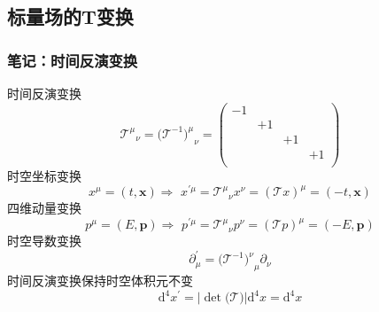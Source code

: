\subsection{标量场的T变换}

\subsubsection{笔记：时间反演变换}
时间反演变换
\begin{equation}
    {\mathcal{T} ^{\mu}}_{\nu}=(\mathcal{T} ^{-1}{)^{\mu}}_{\nu}=\left( \begin{matrix}
	-1&		&		&		\\
	&		+1&		&		\\
	&		&		+1&		\\
	&		&		&		+1\\
\end{matrix} \right) 
\end{equation}
时空坐标变换
\begin{equation}
    x^{\mu}=\left( t,\mathbf{x} \right) \Rightarrow \,\,x^{\prime \mu}={\mathcal{T} ^{\mu}}_{\nu}x^{\nu}=(\mathcal{T} x)^{\mu}=\left( -t,\mathbf{x} \right) 
\end{equation}
四维动量变换
\begin{equation}
    p^{\mu}=\left( E,\mathbf{p} \right) \Rightarrow \,\,p^{\prime \mu}={\mathcal{T} ^{\mu}}_{\nu}p^{\nu}=(\mathcal{T} p)^{\mu}=\left( -E,\mathbf{p} \right) 
\end{equation}
时空导数变换
\begin{equation}
    \partial _{\mu}^{\prime}=(\mathcal{T} ^{-1}{)^{\nu}}_{\mu}\partial _{\nu}
\end{equation}
时间反演变换保持时空体积元不变
\begin{equation}
    \mathrm{d}^4x^{\prime}=\left| \det\mathrm{(}\mathcal{T} ) \right|\mathrm{d}^4x=\mathrm{d}^4x
\end{equation}


